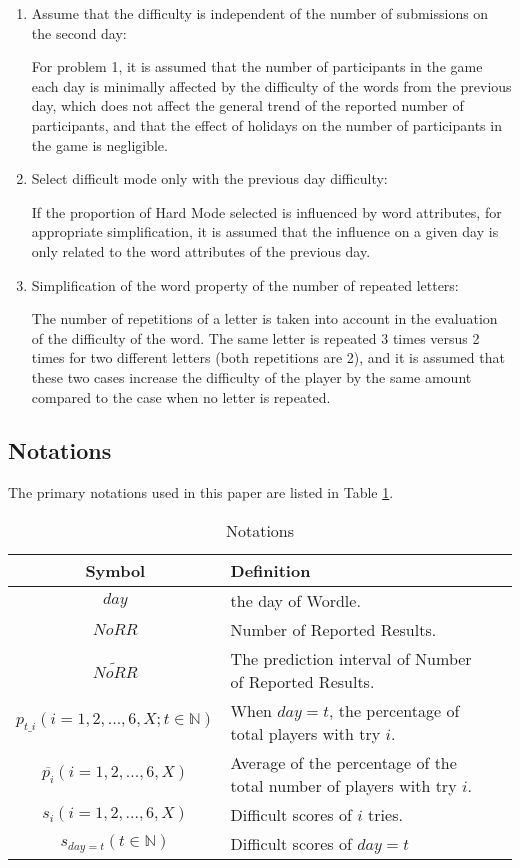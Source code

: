 \documentclass[12pt]{article}  %
\begin{document}
\begin{enumerate}[\bfseries (1)]
    \item Assume that the difficulty is independent of the number of submissions on the second day:

For problem 1, it is assumed that the number of participants in the game each day is minimally affected by the difficulty of the words from the previous day, which does not affect the general trend of the reported number of participants, and that the effect of holidays on the number of participants in the game is negligible.

    \item Select difficult mode only with the previous day difficulty:
    
If the proportion of Hard Mode selected is influenced by word attributes, for appropriate simplification, it is assumed that the influence on a given day is only related to the word attributes of the previous day.

    \item Simplification of the word property of the number of repeated letters:
    
The number of repetitions of a letter is taken into account in the evaluation of the difficulty of the word. The same letter is repeated 3 times versus 2 times for two different letters (both repetitions are 2), and it is assumed that these two cases increase the difficulty of the player by the same amount compared to the case when no letter is repeated.

    
\end{enumerate}


\subsection{Notations}
The primary notations used in this paper are listed in Table \ref{tb:notation}.

\begin{table}[!htbp]
\begin{center}
\caption{Notations}
\begin{tabular}{cll}
	\toprule
	\multicolumn{1}{m{5cm}}{\centering Symbol}
	&\multicolumn{1}{m{10cm}}{\centering Definition}\\
	\midrule
	$day$&the day of Wordle.\\
	$NoRR$&Number of Reported Results.\\
	$\widetilde{NoRR} $ &The prediction interval of Number of Reported Results.\\
        $p_{t\_i}(i=1,2,...,6,X;t \in \mathbb{N})$ &When $day=t$, the percentage of total players with try $i$.\\
        $ \overline{p_i}(i=1,2,...,6,X)$ &Average of the percentage of the total number of players with try $i$.\\
        $s_{i}(i=1,2,...,6,X)$ &Difficult scores of $i$ tries.\\
        $s_{day=t}(t \in \mathbb{N})$ &Difficult scores of $day=t$\\
	\bottomrule
\end{tabular}\label{tb:notation}
\end{center}
\end{table}
\end{document}

